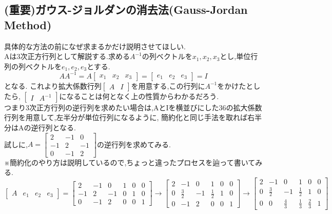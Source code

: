 \subsection{(重要)ガウス-ジョルダンの消去法(Gauss-Jordan Method)}\label{sub:Gauss_jordan}
具体的な方法の前になぜ求まるかだけ説明させてほしい.\\
Aは3次正方行列として解説する.求める$A^{-1}$の列ベクトルを$x_1,x_2,x_3$とし,単位行列の列ベクトルを$e_1,e_2,e_3$とする.
\[
AA^{-1}=A\begin{bmatrix}x_1 & x_2 & x_3\end{bmatrix} = \begin{bmatrix}e_1 & e_2 & e_3\end{bmatrix} = I
\]
となる.
これより拡大係数行列$\begin{bmatrix} A & I\end{bmatrix}$を用意する,この行列に$A^{-1}$をかけたとしたら,
$\begin{bmatrix} I & A^{-1}\end{bmatrix}$になることは何となく上の性質からわかるだろう.\\
つまり3次正方行列の逆行列を求めたい場合は,AとIを横並びにした3\times 6の拡大係数行列を用意して,左半分が単位行列になるように,
簡約化と同じ手法を取れば右半分はAの逆行列となる.\\
試しに,$A=\begin{bmatrix}
    2 & -1 & 0 \\
    -1 & 2 & -1 \\
    0 & -1 & 2
\end{bmatrix}$の逆行列を求めてみる.\\
※簡約化のやり方は説明しているので,ちょっと違ったプロセスを辿って書いてみる.
\[
\begin{bmatrix}A & e_1 & e_2 & e_3 \end{bmatrix}=
\begin{bmatrix}
2 & -1 & 0 & 1 & 0 & 0 \\
-1 & 2 & -1 & 0 & 1 & 0 \\
0 & -1 & 2  & 0 & 0 & 1
\end{bmatrix}
\rightarrow
\begin{bmatrix}
2 & -1 & 0 & 1 & 0 & 0 \\
0 & \frac{3}{2} & -1 & \frac{1}{2} & 1 & 0 \\
0 & -1 & 2  & 0 &0 & 1
\end{bmatrix}
\rightarrow
\begin{bmatrix}
2 & -1 & 0 & 1 & 0 & 0 \\
0 & \frac{3}{2} & -1 & \frac{1}{2} & 1 & 0 \\
0 & 0 & \frac{4}{3} & \frac{1}{3} & \frac{2}{3} & 1
\end{bmatrix}
\]
